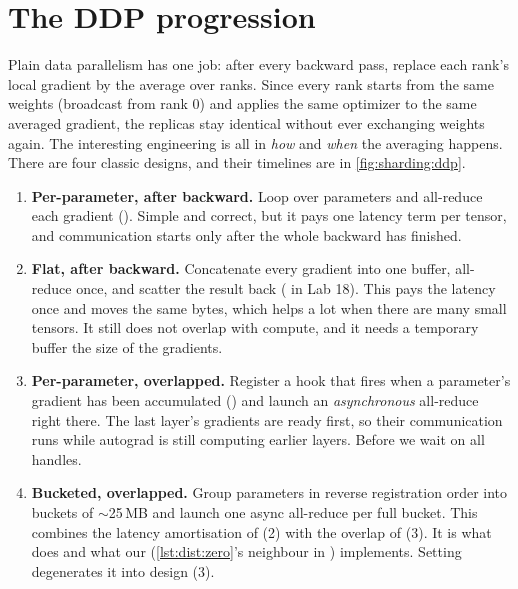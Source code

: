 \section{The DDP progression}\label{sec:sharding:ddp}

Plain data parallelism has one job: after every backward pass, replace each rank's local gradient
by the average over ranks. Since every rank starts from the same weights (broadcast from rank 0)
and applies the same optimizer to the same averaged gradient, the replicas stay identical without
ever exchanging weights again. The interesting engineering is all in \emph{how} and \emph{when}
the averaging happens. There are four classic designs, and their timelines are in
\cref{fig:sharding:ddp}.

\begin{enumerate}
  \item \textbf{Per-parameter, after backward.} Loop over parameters and all-reduce each
    gradient (). Simple and correct, but it pays one
    latency term per tensor, and communication starts only after the whole backward has finished.
  \item \textbf{Flat, after backward.} Concatenate every gradient into one buffer, all-reduce
    once, and scatter the result back ( in Lab 18). This pays the latency
    once and moves the same bytes, which helps a lot when there are many small tensors. It still
    does not overlap with compute, and it needs a temporary buffer the size of the gradients.
  \item \textbf{Per-parameter, overlapped.} Register a hook that fires when a parameter's gradient
    has been accumulated () and launch an
    \emph{asynchronous} all-reduce right there. The last layer's gradients are ready first, so their
    communication runs while autograd is still computing earlier layers. Before
     we wait on all handles.
  \item \textbf{Bucketed, overlapped.} Group parameters in reverse registration order into buckets of
    $\sim$25\,MB and launch one async all-reduce per full bucket. This combines the latency
    amortisation of (2) with the overlap of (3). It is what 
    does and what our  (\cref{lst:dist:zero}'s neighbour in
    ) implements. Setting  degenerates it into design (3).
\end{enumerate}

